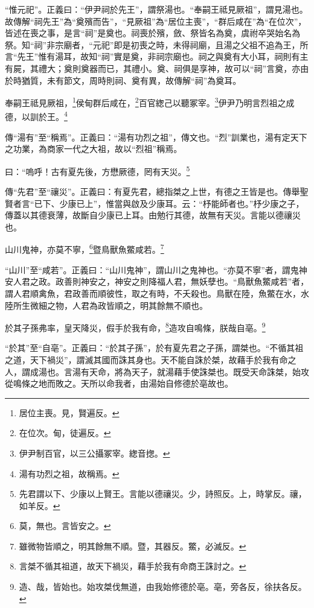 {\noindent\shu{}\fzkt “惟元祀”。正義曰：“伊尹祠於先王”，謂祭湯也。“奉嗣王祗見厥祖”，謂見湯也。故傳解“祠先王”為“奠殯而告”，“見厥祖”為“居位主喪”，“群后咸在”為“在位次”，皆述在喪之事，是言“祠”是奠也。祠喪於殯，斂、祭皆名為奠，虞祔卒哭始名為祭。知“祠”非宗廟者，“元祀”即是初喪之時，未得祠廟，且湯之父祖不追為王，所言“先王”惟有湯耳，故知“祠”實是奠，非祠宗廟也。祠之與奠有大小耳，祠則有主有屍，其禮大；奠則奠器而已，其禮小。奠、祠俱是享神，故可以“祠”言奠，亦由於時猶質，未有節文，周時則祠、奠有異，故傳解“祠”為奠耳。 \par}

奉嗣王祗見厥祖，\footnote{居位主喪。見，賢遍反。}侯甸群后咸在，\footnote{在位次。甸，徒遍反。}百官緫己以聽冢宰。\footnote{伊尹制百官，以三公攝冢宰。緫音揔。}伊尹乃明言烈祖之成德，以訓於王。\footnote{湯有功烈之祖，故稱焉。}

{\noindent\zhuan{}\fzbyks 傳“湯有”至“稱焉”。正義曰：“湯有功烈之祖”，傳文也。“烈”訓業也，湯有定天下之功業，為商家一代之大祖，故以“烈祖”稱焉。 \par}

曰：“嗚呼！古有夏先後，方懋厥德，罔有天災。\footnote{先君謂以下、少康以上賢王。言能以德禳災。少，詩照反。上，時掌反。禳，如羊反。}

{\noindent\zhuan{}\fzbyks 傳“先君”至“禳災”。正義曰：有夏先君，總指桀之上世，有德之王皆是也。傳舉聖賢者言“已下、少康已上”，惟當與啟及少康耳。云：“杼能師者也。”杼少康之子，傳蓋以其德衰薄，故斷自少康已上耳。由勉行其德，故無有天災。言能以德禳災也。 \par}

山川鬼神，亦莫不寧，\footnote{莫，無也。言皆安之。}暨鳥獸魚鱉咸若。\footnote{雖微物皆順之，明其餘無不順。暨，其器反。鱉，必滅反。}

{\noindent\shu{}\fzkt “山川”至“咸若”。正義曰：“山川鬼神”，謂山川之鬼神也。“亦莫不寧”者，謂鬼神安人君之政。政善則神安之，神安之則降福人君，無妖孽也。“鳥獸魚鱉咸若”者，謂人君順禽魚，君政善而順彼性，取之有時，不夭殺也。鳥獸在陸，魚鱉在水，水陸所生微細之物，人君為政皆順之，明其餘無不順也。 \par}

於其子孫弗率，皇天降災，假手於我有命，\footnote{言桀不循其祖道，故天下禍災，藉手於我有命商王誅討之。}造攻自鳴條，朕哉自亳。\footnote{造、哉，皆始也。始攻桀伐無道，由我始修德於亳。亳，旁各反，徐扶各反。}

{\noindent\shu{}\fzkt “於其”至“自亳”。正義曰：“於其子孫”，於有夏先君之子孫，謂桀也。“不循其祖之道，天下禍災”，謂滅其國而誅其身也。天不能自誅於桀，故藉手於我有命之人，謂成湯也。言湯有天命，將為天子，就湯藉手使誅桀也。既受天命誅桀，始攻從鳴條之地而敗之。天所以命我者，由湯始自修德於亳故也。 \par}

